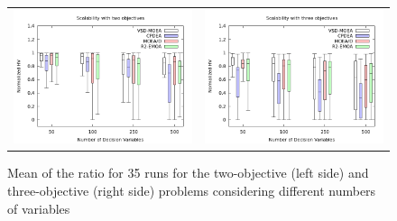 \begin{figure}[h]
\centering
\begin{tabular}{c c}
\includegraphics[scale=0.28]{Images/scalability_2obj.png} & \includegraphics[scale=0.28]{Images/scalability_3obj.png}
\end{tabular}
\caption{Mean of the \HV{} ratio for 35 runs for the two-objective (left side) and three-objective (right side) problems considering different numbers of variables}\label{fig:variable-decision-scalability}
\end{figure}
